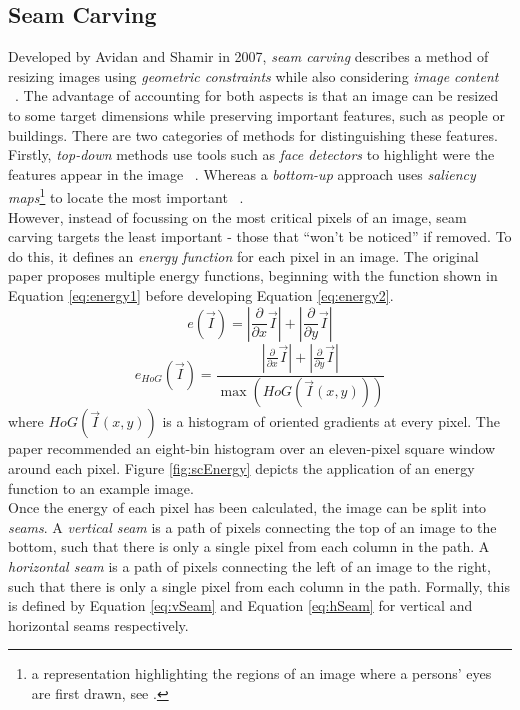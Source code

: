 \subsection{Seam Carving}
\label{sec:seamCarving}
\setlength{\leftskip}{0.5cm}
\indent \indent
Developed by Avidan and Shamir in 2007, \textit{seam carving} describes a method of resizing images using \textit{geometric constraints} while also considering \textit{image content} ~\cite{SeamCarving}. The advantage of accounting for both aspects is that an image can be resized to some target dimensions while preserving important features, such as people or buildings. There are two categories of methods for distinguishing these features. Firstly, \textit{top-down} methods use tools such as \textit{face detectors} to highlight were the features appear in the image ~\cite{Viola}. Whereas a \textit{bottom-up} approach uses \textit{saliency maps}\footnote{a representation highlighting the regions of an image where a persons' eyes are first drawn, see \cite{Saliency}.} to locate the most important ~\cite{Itti}.
\smallskip \\ \indent
However, instead of focussing on the most critical pixels of an image, seam carving targets the least important - those that ``won't be noticed'' if removed. To do this, it defines an \textit{energy function} for each pixel in an image. The original paper proposes multiple energy functions, beginning with the function shown in Equation \ref{eq:energy1} before developing Equation \ref{eq:energy2}.
\begin{equation}
    \label{eq:energy1}
    e(\vec{I}) = \left| \frac{\partial}{\partial x} \vec{I} \right| + \left| \frac{\partial}{\partial y} \vec{I} \right|
\end{equation}
\begin{equation}
    \label{eq:energy2}
    e_{\textit{HoG}}(\vec{I}) = \frac{\left| \frac{\partial}{\partial x} \vec{I} \right| + \left| \frac{\partial}{\partial y} \vec{I} \right|}{\max{(\textit{HoG}(\vec{I}(x,y)))}}
\end{equation}
where $\textit{HoG}(\vec{I}(x,y))$ is a histogram of oriented gradients at every pixel. The paper recommended an eight-bin histogram over an eleven-pixel square window around each pixel. Figure \ref{fig:scEnergy} depicts the application of an energy function to an example image.
\smallskip \\ \indent
Once the energy of each pixel has been calculated, the image can be split into \textit{seams}. A \textit{vertical seam} is a path of pixels connecting the top of an image to the bottom, such that there is only a single pixel from each column in the path. A \textit{horizontal seam} is a path of pixels connecting the left of an image to the right, such that there is only a single pixel from each column in the path. Formally, this is defined by Equation \ref{eq:vSeam} and Equation \ref{eq:hSeam} for vertical and horizontal seams respectively.
